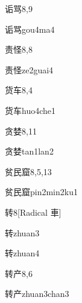 \begin{entry}{诟骂}{8,9}
  \begin{phonetics}{诟骂}{gou4ma4}
  \end{phonetics}
\end{entry}

\begin{entry}{责怪}{8,8}
  \begin{phonetics}{责怪}{ze2guai4}
  \end{phonetics}
\end{entry}

\begin{entry}{货车}{8,4}
  \begin{phonetics}{货车}{huo4che1}
  \end{phonetics}
\end{entry}

\begin{entry}{贪婪}{8,11}
  \begin{phonetics}{贪婪}{tan1lan2}
  \end{phonetics}
\end{entry}

\begin{entry}{贫民窟}{8,5,13}
  \begin{phonetics}{贫民窟}{pin2min2ku1}
  \end{phonetics}
\end{entry}

\begin{entry}{转}{8}[Radical 車]
  \begin{phonetics}{转}{zhuan3}
  \end{phonetics}
  \begin{phonetics}{转}{zhuan4}
  \end{phonetics}
\end{entry}

\begin{entry}{转产}{8,6}
  \begin{phonetics}{转产}{zhuan3chan3}
  \end{phonetics}
\end{entry}

